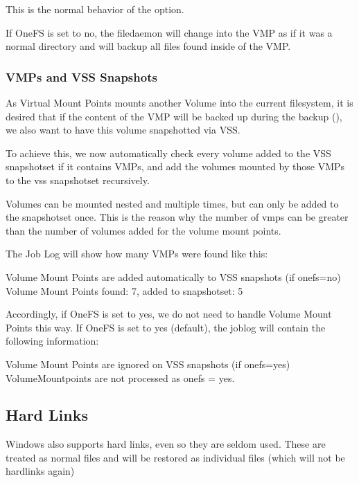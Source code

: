 This is the normal behavior of the  option. 

If OneFS is set to no, the filedaemon will change into the VMP as if it was a normal directory and will backup all files found inside of the VMP.


\subsubsection{VMPs and VSS Snapshots}

As Virtual Mount Points mounts another Volume into the current filesystem, it is desired that if the content of the VMP will be backed up during the backup (), we also want to have this volume snapshotted via VSS.

To achieve this, we now automatically check every volume added to the VSS snapshotset if it contains VMPs, and add the volumes mounted by those VMPs to the vss snapshotset recursively.

Volumes can be mounted nested and multiple times, but can only be added to the snapshotset once. This is the reason why the number of vmps can be greater than the number of volumes added for the volume mount points.

The Job Log will show how many VMPs were found like this:

\begin{bmessage}{Volume Mount Points are added automatically to VSS snapshots (if onefs=no)}
Volume Mount Points found: 7, added to snapshotset: 5
\end{bmessage}

Accordingly, if OneFS is set to yes, we do not need to handle Volume Mount Points this way.
If OneFS is set to yes (default), the joblog will contain the following information: 

\begin{bmessage}{Volume Mount Points are ignored on VSS snapshots (if onefs=yes)}
VolumeMountpoints are not processed as onefs = yes.
\end{bmessage}


\subsection{Hard Links}

Windows also supports hard links, even so they are seldom used.
These are treated as normal files and will be restored as individual files (which will not be hardlinks again)


